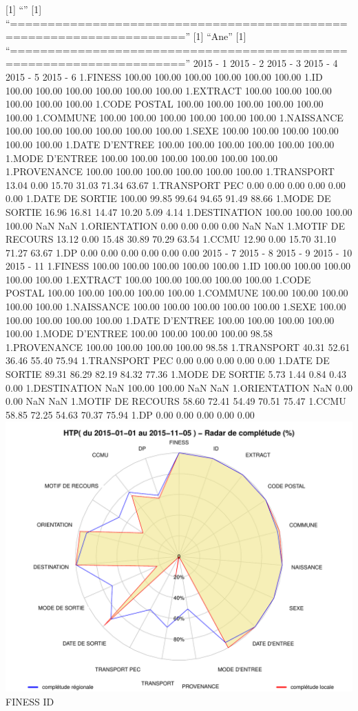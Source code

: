 \documentclass[]{article}
\begin{document}
{[}1{]} ``'' {[}1{]}
``=====================================================================''
{[}1{]} ``Ane'' {[}1{]}
``=====================================================================''
2015 - 1 2015 - 2 2015 - 3 2015 - 4 2015 - 5 2015 - 6 1.FINESS 100.00
100.00 100.00 100.00 100.00 100.00 1.ID 100.00 100.00 100.00 100.00
100.00 100.00 1.EXTRACT 100.00 100.00 100.00 100.00 100.00 100.00 1.CODE
POSTAL 100.00 100.00 100.00 100.00 100.00 100.00 1.COMMUNE 100.00 100.00
100.00 100.00 100.00 100.00 1.NAISSANCE 100.00 100.00 100.00 100.00
100.00 100.00 1.SEXE 100.00 100.00 100.00 100.00 100.00 100.00 1.DATE
D'ENTREE 100.00 100.00 100.00 100.00 100.00 100.00 1.MODE D'ENTREE
100.00 100.00 100.00 100.00 100.00 100.00 1.PROVENANCE 100.00 100.00
100.00 100.00 100.00 100.00 1.TRANSPORT 13.04 0.00 15.70 31.03 71.34
63.67 1.TRANSPORT PEC 0.00 0.00 0.00 0.00 0.00 0.00 1.DATE DE SORTIE
100.00 99.85 99.64 94.65 91.49 88.66 1.MODE DE SORTIE 16.96 16.81 14.47
10.20 5.09 4.14 1.DESTINATION 100.00 100.00 100.00 100.00 NaN NaN
1.ORIENTATION 0.00 0.00 0.00 0.00 NaN NaN 1.MOTIF DE RECOURS 13.12 0.00
15.48 30.89 70.29 63.54 1.CCMU 12.90 0.00 15.70 31.10 71.27 63.67 1.DP
0.00 0.00 0.00 0.00 0.00 0.00 2015 - 7 2015 - 8 2015 - 9 2015 - 10 2015
- 11 1.FINESS 100.00 100.00 100.00 100.00 100.00 1.ID 100.00 100.00
100.00 100.00 100.00 1.EXTRACT 100.00 100.00 100.00 100.00 100.00 1.CODE
POSTAL 100.00 100.00 100.00 100.00 100.00 1.COMMUNE 100.00 100.00 100.00
100.00 100.00 1.NAISSANCE 100.00 100.00 100.00 100.00 100.00 1.SEXE
100.00 100.00 100.00 100.00 100.00 1.DATE D'ENTREE 100.00 100.00 100.00
100.00 100.00 1.MODE D'ENTREE 100.00 100.00 100.00 100.00 98.58
1.PROVENANCE 100.00 100.00 100.00 100.00 98.58 1.TRANSPORT 40.31 52.61
36.46 55.40 75.94 1.TRANSPORT PEC 0.00 0.00 0.00 0.00 0.00 1.DATE DE
SORTIE 89.31 86.29 82.19 84.32 77.36 1.MODE DE SORTIE 5.73 1.44 0.84
0.43 0.00 1.DESTINATION NaN 100.00 100.00 NaN NaN 1.ORIENTATION NaN 0.00
0.00 NaN NaN 1.MOTIF DE RECOURS 58.60 72.41 54.49 70.51 75.47 1.CCMU
58.85 72.25 54.63 70.37 75.94 1.DP 0.00 0.00 0.00 0.00 0.00
\includegraphics{completude_files/figure-latex/finess-15.pdf} FINESS ID
\end{document}
